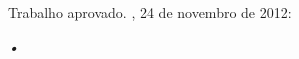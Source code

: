 \documentclass[
	12pt,				%
	openright,			%
	twoside,			%
	a4paper,			%
	english,			%
	brazil				%
	]{abntex2}
\begin{document}
%
% 
%
\begin{folhadeaprovacao}

  \begin{center}
    {\ABNTEXchapterfont\large\imprimirautor}

    \vspace*{\fill}\vspace*{\fill}
    \begin{center}
      \ABNTEXchapterfont\bfseries\Large\imprimirtitulo
    \end{center}
    \vspace*{\fill}
    
    \hspace{.45\textwidth}
    \begin{minipage}{.5\textwidth}
        \imprimirpreambulo
    \end{minipage}%
    \vspace*{\fill}
   \end{center}
        
   Trabalho aprovado. \imprimirlocal, 24 de novembro de 2012:

      
   \begin{center}
    \vspace*{0.5cm}
    {\large\imprimirlocal}
    \par
    {\large\imprimirdata}
    \vspace*{1cm}
  \end{center}
  
\end{folhadeaprovacao}

\begin{dedicatoria}
   \vspace*{\fill}
   \centering
   \noindent
   \textit{•} \vspace*{\fill}
\end{dedicatoria}
\end{document}
